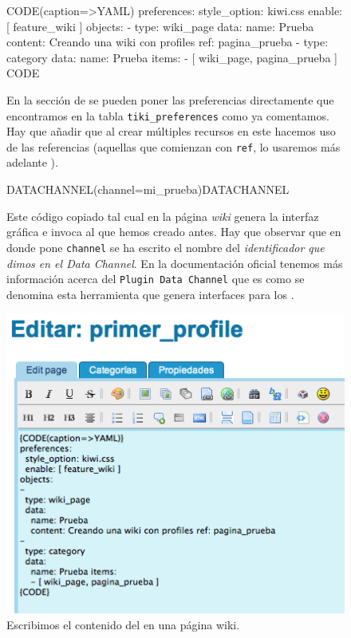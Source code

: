 \begin{figure}
\begin{pyglist}[language=text]
  {CODE(caption=>YAML)}
  preferences: 
   style_option: kiwi.css
   enable: [ feature_wiki ]
  objects:
   -
    type: wiki_page
    data:
      name: Prueba
      content: Creando una wiki con profiles
      ref: pagina_prueba
   -
   type: category
    data:
     name: Prueba
     items:
      - [ wiki_page, pagina_prueba ]
  {CODE}
\end{pyglist}
\caption{En la sección de  se pueden poner las preferencias directamente que encontramos en la tabla \texttt{tiki\_preferences} como ya comentamos. Hay que añadir que al crear múltiples recursos en este \profile{} hacemos uso de las referencias (aquellas que comienzan con \texttt{ref}, lo usaremos más adelante \cite{web:object-references}).}
\label{fig:listado_profile_ejemplo}
\end{figure}

\begin{figure}
\begin{pyglist}[language=text]
  {DATACHANNEL(channel=mi_prueba)}{DATACHANNEL}
\end{pyglist}
\caption{Este código copiado tal cual en la página \textit{wiki} genera la interfaz gráfica e invoca al \profile{} que hemos creado antes. Hay que observar que en donde pone \texttt{channel} se ha escrito el nombre del \textit{identificador que dimos en el \textit{Data Channel}}. En la documentación oficial tenemos más información acerca del \texttt{Plugin Data Channel} que es como se denomina esta herramienta que genera interfaces para los \profiles{} \cite{web:plugin-code}.}
\label{fig:datachannel}
\end{figure}

\begin{figure}
\centering
\includegraphics{../graphics/fig_editar_primer_profile.png}
\caption{Escribimos el contenido del \profile{} en una página wiki.}\label{fig:editar_primer_profile}
\end{figure}


